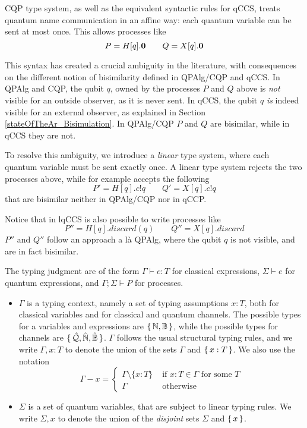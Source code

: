 CQP type system, as well as the equivalent syntactic rules for qCCS, treats quantum name communication in an affine way: each quantum variable can be sent at most once. This allows processes like 
\[ P = H[q].\mathbf{0} \qquad Q = X[q].\mathbf{0}\]

This syntax has created a crucial ambiguity in the literature, with consequences on the different notion of bisimilarity defined in QPAlg/CQP and qCCS. In QPAlg and CQP, the qubit $q$, owned by the processes $P$ and $Q$ above is \textit{not} visible for an outside observer, as it is never sent. In qCCS, the qubit $q$ \textit{is} indeed visible for an external observer, as explained in Section \ref{stateOfTheAr_Bisimulation}. In QPAlg/CQP $P$ and $Q$ are bisimilar, while in qCCS they are not.

To resolve this ambiguity, we introduce a \textit{linear} type system, where each quantum variable must be sent exactly once. A linear type system rejects the two processes above, while for example accepts the following
\[P' = H[q].c!q \qquad Q' = X[q].c!q\]
that are bisimilar neither in QPAlg/CQP nor in qCCP.

Notice that in lqCCS is also possible to write processes like 
\[P'' = H[q].discard(q) \qquad Q'' = X[q].discard\]
$P''$ and $Q''$ follow an approach a là QPAlg, where the qubit $q$ is not visible, and are in fact bisimilar.


The typing judgment are of the form $\Gamma \vdash e : T$ for classical expressions, $\Sigma \vdash e$ for quantum expressions, and $\Gamma; \Sigma \vdash P$ for processes.
\begin{itemize}
\item $\Gamma$ is a typing context, namely a set of typing assumptions $x:T$, both for classical variables and for classical and quantum channels. The possible types for a variables and expressions are $\set{\mathbb{N}, \mathbb{B}}$, while the possible types for channels are $\set{\hat{\mathcal{Q}}, \hat{\mathbb{N}}, \hat{\mathbb{B}}}$. $\Gamma$ follows the usual structural typing rules, and we write $\Gamma, x: T$ to denote the union of the sets $\Gamma$ and $\set{x: T}$. We also use the notation
\[\Gamma - x = \begin{cases}
\Gamma \setminus \{x : T\} &\text{ if } x: T \in \Gamma \text{ for some } T \\
\Gamma &\text{ otherwise}
\end{cases}\]
\item $\Sigma$ is a set of quantum variables, that are subject to linear typing rules. We write $\Sigma, x$ to denote the union of the \textit{disjoint} sets $\Sigma$ and $\set{x}$.
\end{itemize}


